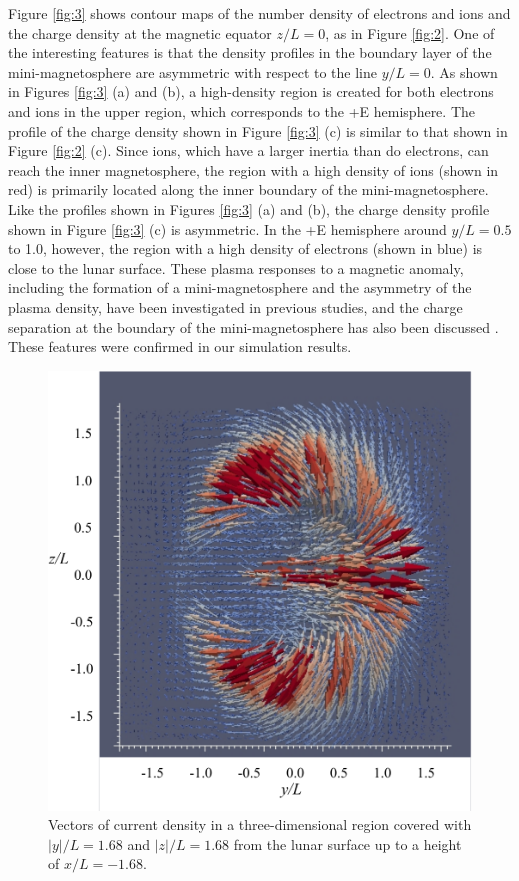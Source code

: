 \documentclass[draft,jgrga]{agutex2015}
\begin{document}
\begin{article}
Figure \ref{fig:3} shows contour maps of the number density of 
electrons and ions and the charge density 
at the magnetic equator $z/L=0$, as in 
Figure \ref{fig:2}. 
One of the interesting features is that the density profiles 
in the boundary layer of the mini-magnetosphere
are asymmetric with respect to the line $y/L =0$.
As shown in Figures \ref{fig:3} (a) and (b), a high-density region is created 
for both electrons and ions in the upper region,
which corresponds to the +E hemisphere. 
The profile of the charge density shown in Figure \ref{fig:3} (c) is 
similar to that shown in Figure \ref{fig:2} (c). 
Since ions, which have a larger inertia than do electrons, can reach the inner magnetosphere, the region with a 
high density of ions (shown in red) is primarily located
along the inner boundary of the mini-magnetosphere. 
Like the profiles shown in Figures \ref{fig:3} (a) and (b), 
the charge density profile shown in Figure \ref{fig:3} (c) is asymmetric. 
In the +E hemisphere around $y/L = 0.5$ to 1.0, however, the region with a
high density of electrons (shown in blue) is close to the lunar surface. 
These plasma responses to a magnetic anomaly, 
including the formation of a mini-magnetosphere and 
the asymmetry of the plasma density, have been investigated 
in previous studies, and the charge separation at the boundary of the mini-magnetosphere has also been discussed
 \citep[e.g.,][]{Harnett2002,Kallio2012,Poppe2012a,Deca2014,Deca2015}.
These features were confirmed in our simulation results.


\begin{figure}[h]
\centering
\noindent\includegraphics[width=12cm]{./figures/Fig_4_bb-crop.pdf}
\caption{
Vectors of current density in a three-dimensional region 
covered with $|y|/L=1.68$ and $|z|/L=1.68$ 
from the lunar surface up to a height of $x/L = -1.68$.
}
\label{fig:4}
\end{figure}


\end{article}
\end{document}
